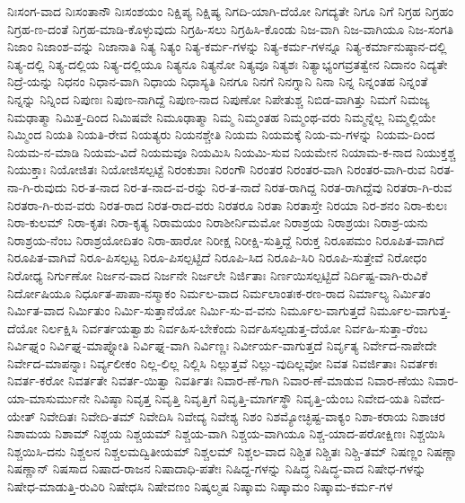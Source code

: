 {ನಿಃಸಂಗ-ವಾದ
ನಿಃಸಂತಾನೌ
ನಿಃಸಂಶಯಂ
ನಿಕ್ಷಿಪ್ಯ
ನಿಕ್ಷಿಷ್ಯ
ನಿಗದಿ-ಯಾಗಿ-ದೆಯೋ
ನಿಗದ್ಯತೇ
ನಿಗೂ
ನಿಗೆ
ನಿಗ್ರಹ
ನಿಗ್ರಹಂ
ನಿಗ್ರಹ-ಣ-ದಂತೆ
ನಿಗ್ರಹ-ಮಾಡಿ-ಕೊಳ್ಳುವುದು
ನಿಗ್ರಹಿ-ಸಲು
ನಿಗ್ರಹಿಸಿ-ಕೊಂಡು
ನಿಜ-ವಾಗಿ
ನಿಜ-ವಾಗಿಯೂ
ನಿಜ-ಸಂಗತಿ
ನಿಜಾಂ
ನಿಜಾಂಶ-ವನ್ನು
ನಿಜಾನಾತಿ
ನಿತ್ಯ
ನಿತ್ಯಂ
ನಿತ್ಯ-ಕರ್ಮ-ಗಳನ್ನು
ನಿತ್ಯ-ಕರ್ಮ-ಗಳನ್ನೂ
ನಿತ್ಯ-ಕರ್ಮಾನುಷ್ಠಾನ-ದಲ್ಲಿ
ನಿತ್ಯ-ದಲ್ಲಿ
ನಿತ್ಯ-ದಲ್ಲಿಯ
ನಿತ್ಯ-ದಲ್ಲಿಯೂ
ನಿತ್ಯನೂ
ನಿತ್ಯನೋ
ನಿತ್ಯವೂ
ನಿತ್ಯಶಃ
ನಿತ್ಯಾಭ್ಯಂಗವ್ರತತ್ವೇನ
ನಿದಾನಂ
ನಿದ್ಯತೇ
ನಿದ್ರೆ-ಯನ್ನು
ನಿಧನಂ
ನಿಧಾನ-ವಾಗಿ
ನಿಧಾಯ
ನಿಧಾಸ್ಯತಿ
ನಿನಗೂ
ನಿನಗೆ
ನಿನಗ್ನಾನಿ
ನಿನಾ
ನಿನ್ನ
ನಿನ್ನಂತಹ
ನಿನ್ನಂತೆ
ನಿನ್ನನ್ನು
ನಿನ್ನಿಂದ
ನಿಪುಣಃ
ನಿಪುಣ-ನಾಗಿದ್ದೆ
ನಿಪುಣ-ನಾದ
ನಿಪುಣೋ
ನಿಪೇತುಶ್ಚ
ನಿಬಿಡ-ವಾಗಿತ್ತು
ನಿಮಗೆ
ನಿಮಜ್ಯ
ನಿಮಢಾತ್ಮಾ
ನಿಮಿತ್ತ-ದಿಂದ
ನಿಮಿಷವೇ
ನಿಮೂಢಾತ್ಮಾ
ನಿಮ್ಮ
ನಿಮ್ಮಂತಹ
ನಿಮ್ಮಂಥ-ವರು
ನಿಮ್ಮನ್ನೆಲ್ಲ
ನಿಮ್ಮಲ್ಲಿಯೇ
ನಿಮ್ಮಿಂದ
ನಿಯತಿ
ನಿಯತಿ-ರೇವ
ನಿಯತ್ಯರು
ನಿಯನಶ್ಚೇತಿ
ನಿಯಮ
ನಿಯಮಕ್ಕೆ
ನಿಯ-ಮ-ಗಳನ್ನು
ನಿಯಮ-ದಿಂದ
ನಿಯಮ-ನ-ಮಾಡಿ
ನಿಯಮ-ವಿದೆ
ನಿಯಮವೂ
ನಿಯಮಿಸಿ
ನಿಯಮಿ-ಸುವ
ನಿಯಮೇನ
ನಿಯಾಮ-ಕ-ನಾದ
ನಿಯುಕ್ತಶ್ಚ
ನಿಯುಕ್ತಾಃ
ನಿಯೋಜಿತಃ
ನಿಯೋಜಿಸಲ್ಪಟ್ಟೆ
ನಿರಂಕುಶಾಃ
ನಿರಂಗೌ
ನಿರಂತರ
ನಿರಂತರ-ವಾಗಿ
ನಿರಂತರ-ವಾಗಿ-ರುವ
ನಿರತ-ನಾ-ಗಿ-ರುವುದು
ನಿರ-ತ-ನಾದ
ನಿರ-ತ-ನಾದ-ವ-ರನ್ನು
ನಿರ-ತ-ನಾದೆ
ನಿರತ-ರಾಗಿದ್ದ
ನಿರತ-ರಾಗಿದ್ದೆವು
ನಿರತರಾ-ಗಿ-ರುವ
ನಿರತರಾ-ಗಿ-ರುವ-ವರು
ನಿರತ-ರಾದ
ನಿರತ-ರಾದ-ವರು
ನಿರತರೂ
ನಿರತಾ
ನಿರತಾಸ್ತೇ
ನಿರಯಾ
ನಿರ-ಶನಂ
ನಿರಾ-ಕುಲಃ
ನಿರಾ-ಕುಲಮ್
ನಿರಾ-ಕೃತಃ
ನಿರಾ-ಕೃತ್ಯ
ನಿರಾಮಯಂ
ನಿರಾಶೀರ್ನಿಮಮೋ
ನಿರಾಶ್ರಯ
ನಿರಾಶ್ರಯಃ
ನಿರಾಶ್ರ-ಯನು
ನಿರಾಶ್ರಯ-ನೆಂಬ
ನಿರಾಶ್ರಯೋದಿತಂ
ನಿರಾ-ಹಾರೋ
ನಿರೀಕ್ಷ
ನಿರೀಕ್ಷಿ-ಸುತ್ತಿದ್ದೆ
ನಿರುಕ್ತ
ನಿರೂಪಮಂ
ನಿರೂಪಿತ-ವಾಗಿದೆ
ನಿರೂಪಿತ-ವಾಗಿವೆ
ನಿರೂ-ಪಿಸಲ್ಪಟ್ಟ
ನಿರೂ-ಪಿಸಲ್ಪಟ್ಟಿದೆ
ನಿರೂಪಿ-ಸಿದ
ನಿರೂಪಿ-ಸಿರಿ
ನಿರೂಪಿ-ಸುತ್ತೇವೆ
ನಿರೋಧಂ
ನಿರೋಧ್ಯ
ನಿರ್ಗುಣೋ
ನಿರ್ಜನ-ವಾದ
ನಿರ್ಜನೇ
ನಿರ್ಜಲೇ
ನಿರ್ಜಿತಾಃ
ನಿರ್ಣಯಿಸಲ್ಪಟ್ಟಿದೆ
ನಿರ್ದಿಷ್ಟ-ವಾಗಿ-ರುವಿಕೆ
ನಿರ್ದೋಷಿಯೂ
ನಿರ್ಧೂತ-ಪಾಪಾ-ನಸ್ಮಾಕಂ
ನಿರ್ಮಲ-ವಾದ
ನಿರ್ಮಲಾಂತಃಕ-ರಣ-ರಾದ
ನಿರ್ಮಾಲ್ಯ
ನಿರ್ಮಿತಂ
ನಿರ್ಮಿತ-ವಾದ
ನಿರ್ಮಿತುಂ
ನಿರ್ಮಿ-ಸುತ್ತಾನೆಯೋ
ನಿರ್ಮಿ-ಸು-ವ-ವನು
ನಿರ್ಮೂಲ-ವಾಗುತ್ತದೆ
ನಿರ್ಮೂಲ-ವಾಗುತ್ತ-ದೆಯೋ
ನಿರ್ಲಕ್ಷಿಸಿ
ನಿರ್ವರ್ತಯತ್ವಾಶು
ನಿರ್ವಹಿಸ-ಬೇಕೆಂದು
ನಿರ್ವಹಿಸಲ್ಪಡುತ್ತ-ದೆಯೋ
ನಿರ್ವಹಿ-ಸುತ್ತಾ-ರೆಂಬ
ನಿರ್ವಿಘ್ನಂ
ನಿರ್ವಿಘ್ನ-ಮಾಪ್ನೋತಿ
ನಿರ್ವಿಘ್ನ-ವಾಗಿ
ನಿರ್ವಿಣ್ಣಃ
ನಿರ್ವೀರ್ಯ-ವಾಗುತ್ತದೆ
ನಿರ್ವೃತ್ಯ
ನಿರ್ವೇದ-ನಾಪೇದೇ
ನಿರ್ವೇದ-ಮಾಪನ್ನಾಃ
ನಿರ್ವ್ಯಲೀಕಂ
ನಿಲ್ಲ-ಲಿಲ್ಲ
ನಿಲ್ಲಿಸಿ
ನಿಲ್ಲುತ್ತವೆ
ನಿಲ್ಲು-ವುದಿಲ್ಲವೋ
ನಿವತ
ನಿವರ್ಜಿತಾಃ
ನಿವರ್ತಕಃ
ನಿವರ್ತ-ಕರೋ
ನಿವರ್ತತೇ
ನಿವರ್ತ-ಯಿತ್ವಾ
ನಿವರ್ತಿತಃ
ನಿವಾರ-ಣೆ-ಗಾಗಿ
ನಿವಾರ-ಣೆ-ಮಾಡುವ
ನಿವಾರ-ಣೆಯು
ನಿವಾರ-ಯಾ-ಮಾಸುರ್ಮುನೇ
ನಿವಿಷ್ಠಾ
ನಿವೃತ್ತ
ನಿವೃತ್ತಿ
ನಿವೃತ್ತಿಗೆ
ನಿವೃತ್ತಿ-ಮಾರ್ಗಸ್ಥೌ
ನಿವೃತ್ತಿ-ಯೆಂಬ
ನಿವೇದ-ಯತಿ
ನಿವೇದ-ಯೇತ್
ನಿವೇದಿತಃ
ನಿವೇದಿ-ತಮ್
ನಿವೇದಿಸಿ
ನಿವೇದ್ಯ
ನಿವೇಶ್ಯ
ನಿಶಂ
ನಿಶಮ್ಯೋಚ್ಛಿಷ್ಟ-ವಾಕ್ಯಂ
ನಿಶಾ-ಕರಾಯ
ನಿಶಾಚರ
ನಿಶಾಮಯ
ನಿಶಾಮ್
ನಿಶ್ಚಯ
ನಿಶ್ಚಯಮ್
ನಿಶ್ಚಯ-ವಾಗಿ
ನಿಶ್ಚಯ-ವಾಗಿಯೂ
ನಿಶ್ಚ-ಯಾದ-ಪರೋಕ್ಷಿಣಃ
ನಿಶ್ಚಯಿಸಿ
ನಿಶ್ಚಯಿಸಿ-ದನು
ನಿಶ್ಚಲನ
ನಿಶ್ಚಲಮದ್ವಿತೀಯಮ್
ನಿಶ್ಚಲಮ್
ನಿಶ್ಚಲ-ವಾದ
ನಿಶ್ಚಿತ
ನಿಶ್ಚಿತಃ
ನಿಶ್ಚಿ-ತಮ್
ನಿಷಣ್ಣಂ
ನಿಷಣ್ಣಾ
ನಿಷಣ್ಣಾನ್
ನಿಷಸಾದ
ನಿಷಾದ-ರಾಜನ
ನಿಷಾದಾಧಿ-ಪತೇಃ
ನಿಷಿದ್ದ-ಗಳನ್ನು
ನಿಷಿದ್ಧ
ನಿಷಿದ್ಧ-ವಾದ
ನಿಷೇಧ-ಗಳನ್ನು
ನಿಷೇಧ-ಮಾಡುತ್ತಿ-ರುವಿರಿ
ನಿಷೇಧಸಿ
ನಿಷೇವಣಂ
ನಿಷ್ಕಲ್ಮಷ
ನಿಷ್ಕಾಮ
ನಿಷ್ಕಾಮಂ
ನಿಷ್ಕಾಮ-ಕರ್ಮ-ಗಳ
}
